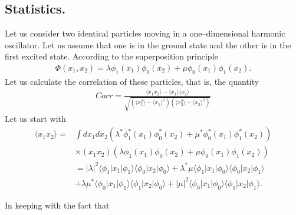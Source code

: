 \begin{subappendices}
   

\section{Statistics.}\label{App6D}
Let us consider two identical particles moving in a one--dimensional harmonic oscillator. Let us assume  that one is in the ground state and the other  is in the first excited state. According to the superposition principle 
\begin{align}\label{eqApp6G1}
\Phi(x_1,x_2)=\lambda\phi_1(x_1)\phi_0(x_2)+\mu\phi_0(x_1)\phi_1(x_2).
\end{align} 
Let us calculate the correlation of these particles, that is, the quantity
\begin{align}\label{eqApp6G2}
Corr=\frac{\langle x_1x_2\rangle-\langle x_1\rangle\langle x_2\rangle}{\sqrt{\left(\langle x_1^2\rangle-\langle x_1\rangle^2\right)\left(\langle x_2^2\rangle-\langle x_2\rangle^2\right)}}
\end{align} 
Let us start with
\begin{align}\label{eqApp63}
\nonumber\langle x_1x_2\rangle=&\int dx_1 dx_2 \left(\lambda^*\phi_1^*(x_1)\phi_0^*(x_2)+\mu^*\phi_0^*(x_1)\phi_1^*(x_2)\right)\\
\nonumber&\times(x_1 x_2)\left(\lambda\phi_1(x_1)\phi_0(x_2)+\mu\phi_0(x_1)\phi_1(x_2)\right)\\
\nonumber &=|\lambda|^2\langle\phi_1|x_1|\phi_1\rangle\langle\phi_0|x_2|\phi_0\rangle+\lambda^*\mu\langle\phi_1|x_1|\phi_0\rangle\langle\phi_0|x_2|\phi_1\rangle\\
&+\lambda\mu^*\langle\phi_0|x_1|\phi_1\rangle\langle\phi_1|x_2|\phi_0\rangle+|\mu|^2\langle\phi_0|x_1|\phi_0\rangle\langle\phi_1|x_2|\phi_1\rangle.
\end{align} 

In keeping with the fact that


\end{subappendices}
